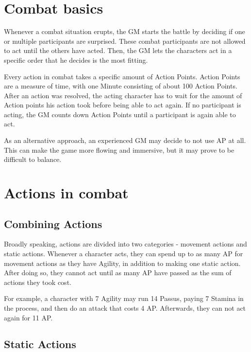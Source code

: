 \section{Combat basics}
Whenever a combat situation erupts, the GM starts the battle by deciding if one or multiple participants are surprised. These combat participants are not allowed to act until the others have acted. Then, the GM lets the characters act in a specific order that he decides is the most fitting.

Every action in combat takes a specific amount of Action Points. Action Points are a measure of time, with one Minute consisting of about 100 Action Points. After an action was resolved, the acting character has to wait for the amount of Action points his action took before being able to act again. If no participant is acting, the GM counts down Action Points until a participant is again able to act.

As an alternative approach, an experienced GM may decide to not use AP at all. This can make the game more flowing and immersive, but it may prove to be difficult to balance.



\section{Actions in combat}

\subsection{Combining Actions}
Broadly speaking, actions are divided into two categories - movement actions and static actions. Whenever a character acts, they can spend up to as many AP for movement actions as they have Agility, in addition to making one static action. After doing so, they cannot act until as many AP have passed as the sum of actions they took cost.

For example, a character with 7 Agility may run 14 Passus, paying 7 Stamina in the process, and then do an attack that costs 4 AP. Afterwards, they can not act again for 11 AP.

\subsection{Static Actions}

